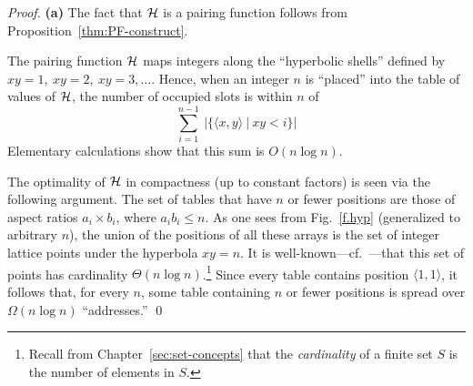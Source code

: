 \begin{proof}
{\bf (a)} The fact that $\mbox{$\cal H$}$ is a pairing function follows from
Proposition~\ref{thm:PF-construct}.

The pairing function $\mbox{$\cal H$}$ maps integers along the ``hyperbolic
shells'' defined by $xy = 1, \ xy =2, \ xy=3, \ldots$.  Hence,
when an integer $n$ is ``placed'' into the table of values of
$\mbox{$\cal H$}$, the number of occupied slots is within $n$ of
\[ \sum_{i=1}^{n-1} \ |\{ \langle x,y \rangle \ | \ xy < i \}| 
\]
Elementary calculations show that this sum is $O(n \log n)$.

 The optimality of $\mbox{$\cal H$}$ in compactness (up to
constant factors) is seen via the following argument.  The set of
tables that have $n$ or fewer positions are those of aspect ratios
$a_i \times b_i$, where $a_i b_i \leq n$.  As one sees from
Fig.~\ref{f.hyp} (generalized to arbitrary $n$), the union of the
positions of all these arrays is the set of integer lattice points
under the hyperbola $xy = n$.  It is
well-known---cf.~\cite{NivenZ80}---that this set of points has
cardinality $\Theta(n \log n)$.\footnote{Recall from
  Chapter~\ref{sec:set-concepts} that the {\it cardinality} of a
  finite set $S$ is the number of elements in $S$.}  Since every table
contains position $\langle 1,1 \rangle$, it follows that, for every
$n$, some table containing $n$ or fewer positions is spread over
$\Omega(n \log n)$ ``addresses.''  \qed
\end{proof}
